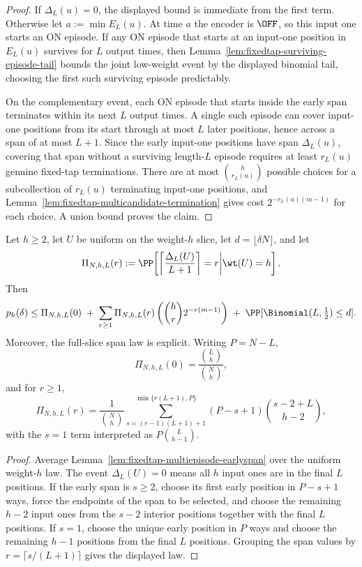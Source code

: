 \begin{proof}
If \(\Delta_L(u)=0\), the displayed bound is immediate from the first term. Otherwise let \(a:=\min E_L(u)\). At time
\(a\) the encoder is \(\OFF\), so this input one starts an ON episode. If any ON episode that starts at an input-one
position in \(E_L(u)\) survives for \(L\) output times, then Lemma~\ref{lem:fixedtap-surviving-episode-tail} bounds the
joint low-weight event by the displayed binomial tail, choosing the first such surviving episode predictably.

On the complementary event, each ON episode that starts inside the early span terminates within its next \(L\) output
times. A single such episode can cover input-one positions from its start through at most \(L\) later positions, hence
across a span of at most \(L+1\). Since the early input-one positions have span \(\Delta_L(u)\), covering that span
without a surviving length-\(L\) episode requires at least
\(r_L(u)\) genuine fixed-tap terminations. There are at most
\(\binom{h}{r_L(u)}\) possible choices for a subcollection of \(r_L(u)\) terminating input-one positions, and
Lemma~\ref{lem:fixedtap-multicandidate-termination} gives cost \(2^{-r_L(u)(m-1)}\) for each choice. A union bound
proves the claim.
\end{proof}

\begin{corollary}
\label{cor:fixedtap-weight-slice-multiepisode}
Let \(h\ge 2\), let \(U\) be uniform on the weight-\(h\) slice, let \(d=\lfloor\delta N\rfloor\), and let
\[
\Pi_{N,h,L}(r):=\PP\!\left[
\left\lceil\frac{\Delta_L(U)}{L+1}\right\rceil=r
\middle| \wt(U)=h
\right].
\]
Then
\[
p_h(\delta)
\le
\Pi_{N,h,L}(0)
\;+\;
\sum_{r\ge 1}
\Pi_{N,h,L}(r)
\left(
\binom{h}{r}2^{-r(m-1)}
\right)
\;+\;
\PP[\Binomial(L,\tfrac12)\le d].
\]
Moreover, the full-slice span law is explicit. Writing \(P=N-L\),
\[
\Pi_{N,h,L}(0)=\frac{\binom{L}{h}}{\binom{N}{h}},
\]
and for \(r\ge 1\),
\[
\Pi_{N,h,L}(r)
=
\frac{1}{\binom{N}{h}}
\sum_{s=(r-1)(L+1)+1}^{\min\{r(L+1),P\}}
(P-s+1)\binom{s-2+L}{h-2},
\]
with the \(s=1\) term interpreted as \(P\binom{L}{h-1}\).
\end{corollary}

\begin{proof}
Average Lemma~\ref{lem:fixedtap-multiepisode-earlyspan} over the uniform weight-\(h\) law. The event
\(\Delta_L(U)=0\) means all \(h\) input ones are in the final \(L\) positions. If the early span is \(s\ge 2\), choose
its first early position in \(P-s+1\) ways, force the endpoints of the span to be selected, and choose the remaining
\(h-2\) input ones from the \(s-2\) interior positions together with the final \(L\) positions. If \(s=1\), choose the
unique early position in \(P\) ways and choose the remaining \(h-1\) positions from the final \(L\) positions. Grouping
the span values by \(r=\lceil s/(L+1)\rceil\) gives the displayed law.
\end{proof}

